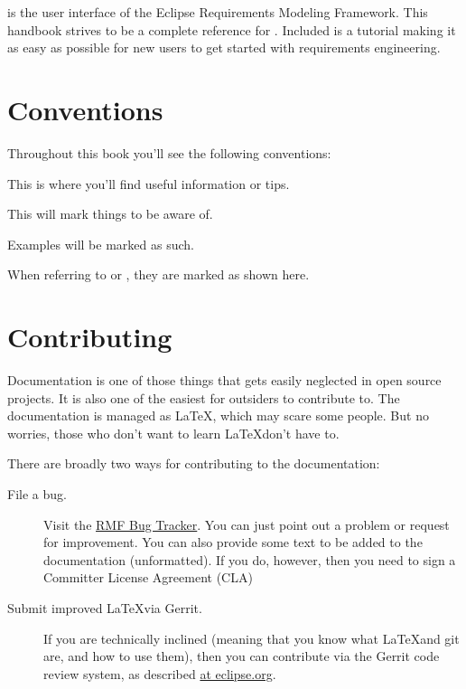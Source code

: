 \pror{} is the user interface of the Eclipse Requirements Modeling Framework.  This handbook strives to be a complete reference for \pror{}.  Included is a tutorial making it as easy as possible for new users to get started with requirements engineering.

\section{Conventions}

Throughout this book you'll see the following conventions:

\begin{info}
This is where you'll find useful information or tips.
\end{info}

\begin{warning}
This will mark things to be aware of.
\end{warning}

\begin{example}
Examples will be marked as such.
\end{example}


When referring to  or , they are marked as shown here.


\section{Contributing}

Documentation is one of those things that gets easily neglected in open source projects.  It is also one of the easiest for outsiders to contribute to.  The documentation is managed as \LaTeX, which may scare some people.  But no worries, those who don't want to learn \LaTeX don't have to.

There are broadly two ways for contributing to the documentation:

\begin{description}
  \item[File a bug.]  Visit the \href{https://bugs.eclipse.org/bugs/enter_bug.cgi?assigned_to=&blocked=&bug_severity=normal&bug_status=NEW&comment=&contenttypeentry=&contenttypemethod=autodetect&data=&dependson=&description=&flag_type-1=X&flag_type-11=X&flag_type-12=X&flag_type-2=X&flag_type-4=X&flag_type-6=X&flag_type-7=X&flag_type-8=X&form_name=enter_bug&keywords=&&op_sys=All&product=MDT.RMF&qa_contact=&rep_platform=All&short_desc=&version=unspecified}{RMF Bug Tracker}.  You can just point out a problem or request for improvement.  You can also provide some text to be added to the documentation (unformatted).  If you do, however, then you need to sign a Committer License Agreement (CLA)
  \item[Submit improved \LaTeX via Gerrit.]  If you are technically inclined (meaning that you know what \LaTeX and git are, and how to use them), then you can contribute via the Gerrit code review system, as described \href{https://wiki.eclipse.org/Gerrit}{at eclipse.org}.
\end{description}

